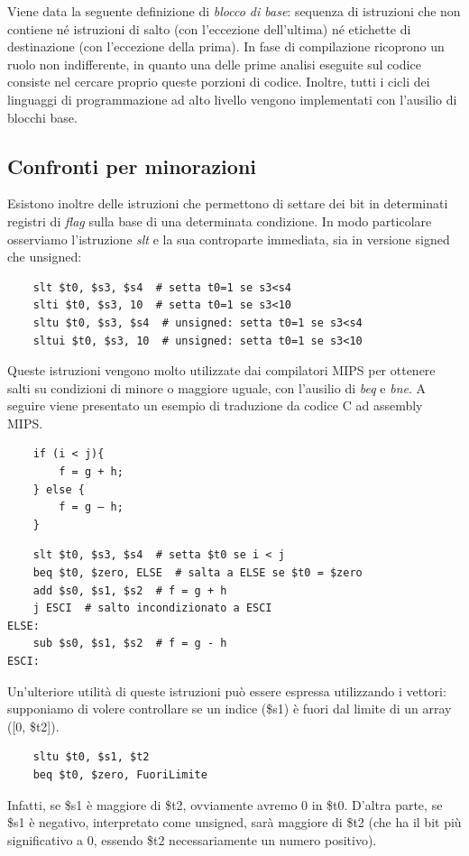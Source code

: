 \documentclass[class=book, crop=false]{standalone}
\begin{document}
Viene data la seguente definizione di \emph{blocco di base}: sequenza di istruzioni che non contiene né istruzioni di salto (con l’eccezione dell’ultima) né etichette di destinazione (con l’eccezione della prima). In fase di compilazione ricoprono un ruolo non indifferente, in quanto una delle prime analisi eseguite sul codice consiste nel cercare proprio queste porzioni di codice. Inoltre, tutti i cicli dei linguaggi di programmazione ad alto livello vengono implementati con l'ausilio di blocchi base.

\subsection{Confronti per minorazioni}
Esistono inoltre delle istruzioni che permettono di settare dei bit in determinati registri di \emph{flag} sulla base di una determinata condizione. In modo particolare osserviamo l'istruzione \emph{slt} e la sua controparte immediata, sia in versione signed che unsigned:
\begin{verbatim}
	slt $t0, $s3, $s4  # setta t0=1 se s3<s4
	slti $t0, $s3, 10  # setta t0=1 se s3<10
	sltu $t0, $s3, $s4  # unsigned: setta t0=1 se s3<s4
	sltui $t0, $s3, 10  # unsigned: setta t0=1 se s3<10
\end{verbatim}
Queste istruzioni vengono molto utilizzate dai compilatori MIPS per ottenere salti su condizioni di minore o maggiore uguale, con l'ausilio di \emph{beq} e \emph{bne}. A seguire viene presentato un esempio di traduzione da codice C ad assembly MIPS.
\begin{verbatim}
	if (i < j){
		f = g + h;
	} else {
		f = g – h;
	}
\end{verbatim}
\begin{verbatim}
	slt $t0, $s3, $s4  # setta $t0 se i < j
	beq $t0, $zero, ELSE  # salta a ELSE se $t0 = $zero
	add $s0, $s1, $s2  # f = g + h
	j ESCI  # salto incondizionato a ESCI
ELSE:
	sub $s0, $s1, $s2  # f = g - h
ESCI:
\end{verbatim}
Un'ulteriore utilità di queste istruzioni può essere espressa utilizzando i vettori: supponiamo di volere controllare se un indice (\$s1) è fuori dal limite di un array ([0, \$t2]).
\begin{verbatim}
	sltu $t0, $s1, $t2
	beq $t0, $zero, FuoriLimite
\end{verbatim}
Infatti, se \$s1 è maggiore di \$t2, ovviamente avremo 0 in \$t0. D'altra parte, se \$s1 è negativo, interpretato come unsigned, sarà maggiore di \$t2 (che ha il bit più significativo a 0, essendo \$t2 necessariamente un numero positivo).
\end{document}
